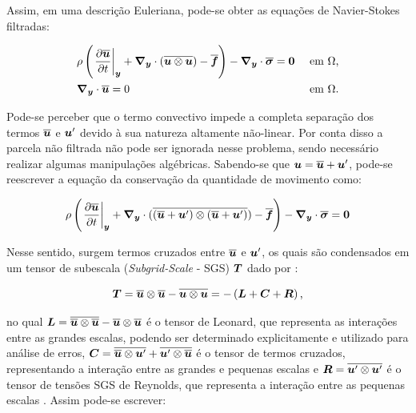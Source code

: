 Assim, em uma descrição Euleriana, pode-se obter as equações de Navier-Stokes filtradas:

\begin{subequations}
    \begin{align}
         & \rho\left({\left.\frac{\partial \overline{\boldsymbol{u}}}{\partial t}\right|_{\boldsymbol{y}}+\boldsymbol{\nabla_y}\cdot(\overline{\boldsymbol{u}\otimes\boldsymbol{u}})-\overline{\boldsymbol{f}}}\right)-\boldsymbol{\nabla_y}\cdot\overline{\boldsymbol{\sigma}}=\boldsymbol{0} &  & \text{ em }\Omega\text{,} \\
         & \boldsymbol{\nabla_y}\cdot\overline{\boldsymbol{u}}=0                                                                                        &  & \text{ em }\Omega\text{.}
    \end{align}
\end{subequations}

Pode-se perceber que o termo convectivo impede a completa separação dos termos $\overline{\boldsymbol{u}}$ e $\boldsymbol{u}'$ devido à sua natureza altamente não-linear. Por conta disso a parcela não filtrada não pode ser ignorada nesse problema, sendo necessário realizar algumas manipulações algébricas. Sabendo-se que $\boldsymbol{u}=\overline{\boldsymbol{u}}+\boldsymbol{u}'$, pode-se reescrever a equação da conservação da quantidade de movimento como:

\begin{equation}
    \rho\left({\left.\frac{\partial \overline{\boldsymbol{u}}}{\partial t}\right|_{\boldsymbol{y}}+\boldsymbol{\nabla_y}\cdot(\overline{(\overline{\boldsymbol{u}}+\boldsymbol{u}')\otimes(\overline{\boldsymbol{u}}+\boldsymbol{u}')})-\overline{\boldsymbol{f}}}\right)-\boldsymbol{\nabla_y}\cdot\overline{\boldsymbol{\sigma}}=\boldsymbol{0}
\end{equation}

Nesse sentido, surgem termos cruzados entre $\overline{\boldsymbol{u}}$ e $\boldsymbol{u}'$, os quais são condensados em um tensor de subescala (\textit{Subgrid-Scale} - SGS) $\boldsymbol{T}$ dado por \cite{piomelli1999large,hughes2000large}:

\begin{equation}
    \boldsymbol{T}=\overline{\boldsymbol{u}}\otimes\overline{\boldsymbol{u}}-\overline{\boldsymbol{u}\otimes\boldsymbol{u}}=-\left({\boldsymbol{L}+\boldsymbol{C}+\boldsymbol{R}}\right)\text{,}
\end{equation}

\noindent no qual $\boldsymbol{L}=\overline{\overline{\boldsymbol{u}}\otimes\overline{\boldsymbol{u}}}-\overline{\boldsymbol{u}}\otimes\overline{\boldsymbol{u}}$ é o tensor de Leonard, que representa as interações entre as grandes escalas, podendo ser determinado explicitamente e utilizado para análise de erros, $\boldsymbol{C}=\overline{\overline{\boldsymbol{u}}\otimes\boldsymbol{u}'}+\overline{\boldsymbol{u}'\otimes\overline{\boldsymbol{u}}}$ é o tensor de termos cruzados, representando a interação entre as grandes e pequenas escalas e $\boldsymbol{R}=\overline{\boldsymbol{u}'\otimes\boldsymbol{u}'}$ é o tensor de tensões SGS de Reynolds, que representa a interação entre as pequenas escalas \cite{piomelli1999large}. Assim pode-se escrever:

